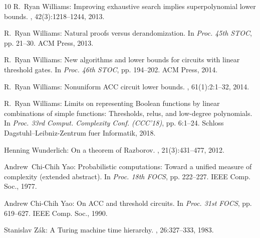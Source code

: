 \documentclass[11pt]{article}
\begin{document}
\begin{thebibliography}{10}
{\sc R.~Ryan Williams}: Improving exhaustive search implies superpolynomial
  lower bounds.
, 42(3):1218--1244, 2013.
\newblock [\epfmtdoi{10.1137/10080703X}]

{\sc R.~Ryan Williams}: Natural proofs versus derandomization.
\newblock In {\em Proc. 45th STOC}, pp. 21--30. ACM Press, 2013.
\newblock [\epfmtdoi{10.1145/2488608.2488612}]

{\sc R.~Ryan Williams}: New algorithms and lower bounds for circuits with
  linear threshold gates.
\newblock In {\em Proc. 46th STOC}, pp. 194--202. ACM Press, 2014.
\newblock [\epfmtdoi{10.1145/2591796.2591858}]

{\sc R.~Ryan Williams}: Nonuniform {ACC} circuit lower bounds.
, 61(1):2:1--32, 2014.
\newblock [\epfmtdoi{10.1145/2559903}]

{\sc R.~Ryan Williams}: Limits on representing {B}oolean functions by linear
  combinations of simple functions: {T}hresholds, relus, and low-degree
  polynomials.
\newblock In {\em Proc. 33rd Comput. Complexity Conf. (CCC'18)}, pp. 6:1--24.
  Schloss Dagstuhl--Leibniz-Zentrum fuer Informatik, 2018.

{\sc Henning Wunderlich}: On a theorem of {R}azborov.
, 21(3):431--477, 2012.
\newblock [\epfmtdoi{10.1007/s00037-011-0021-5}]

{\sc Andrew~Chi{-}Chih Yao}: Probabilistic computations: {T}oward a unified
  measure of complexity (extended abstract).
\newblock In {\em Proc. 18th FOCS}, pp. 222--227. IEEE Comp. Soc., 1977.

{\sc Andrew Chi-Chih Yao}: On {ACC} and threshold circuits.
\newblock In {\em Proc. 31st FOCS}, pp. 619--627. IEEE Comp. Soc., 1990.

{\sc Stanislav Z{\'a}k}: A {T}uring machine time hierarchy.
, 26:327--333, 1983.
\newblock [\epfmtdoi{10.1016/0304-3975(83)90015-4}]

\end{thebibliography}
\end{document}

